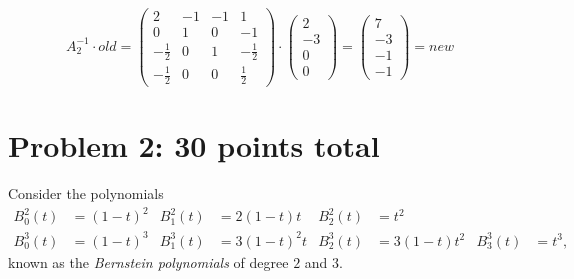 \documentclass[12pt]{article}
\begin{document}
\[
A_2^{-1} \cdot old  = 
\begin{pmatrix}
2 & -1 & -1 & 1\\
0 & 1 & 0 & -1 \\
-\frac{1}{2} & 0 & 1 & -\frac{1}{2} \\
-\frac{1}{2} & 0 & 0 & \frac{1}{2}
\end{pmatrix}\cdot 
\begin{pmatrix}
2\\
-3\\
0\\
0
\end{pmatrix} =
\begin{pmatrix}
7\\
-3\\
-1\\
-1
\end{pmatrix} = new
\] 

\section*{Problem 2: 30 points total}
\label{prob-3.3}
Consider the polynomials
\begin{align*}
B_0^2(t) & = (1 - t)^2  & B_1^2(t)  & = 2(1 - t)t & B_2^2(t) & = t^2 
&   &    \\
B_0^3(t) & = (1 - t)^3  & B_1^3(t) & = 3(1 - t)^2t & B_2^3(t) & = 3(1 - t)t^2 
 &  B_3^3(t) & = t^3,
\end{align*}
known as the {\it Bernstein polynomials\/} of degree $2$ and $3$.
\end{document}
